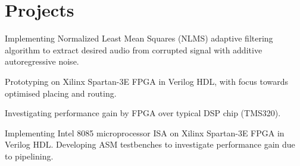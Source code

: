 \documentclass[]{deedy}%
\begin{document}
\begin{minipage}[t]{0.72\textwidth}%
%
\section{Projects}%
%
%
%
\vspace{\topsep}%
\begin{tightemize}%
\item Implementing Normalized Least Mean Squares (NLMS) adaptive filtering algorithm to extract desired audio from corrupted signal with additive autoregressive noise.
\item Prototyping on Xilinx Spartan-3E FPGA in Verilog HDL, with focus towards optimised placing and routing.
\item Investigating performance gain by FPGA over typical DSP chip (TMS320).
\end{tightemize}%
\sectionsep
%
%
%
%
\begin{tightemize}%
\item Implementing Intel 8085 microprocessor ISA on Xilinx Spartan-3E FPGA in Verilog HDL. Developing ASM testbenches to investigate performance gain due to pipelining.
\end{tightemize}%
\sectionsep
%
%
%
\begin{tightemize}%
\item
\end{tightemize}%
\sectionsep
%

\end{minipage}
\end{document}
